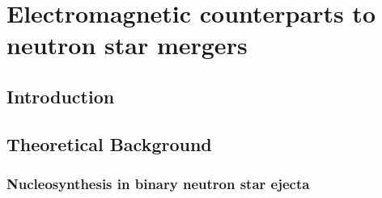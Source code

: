 \part{Electromagnetic counterparts to neutron star mergers}




\chapter{Introduction}



\chapter{Theoretical Background}


\section{Nucleosynthesis in binary neutron star ejecta}